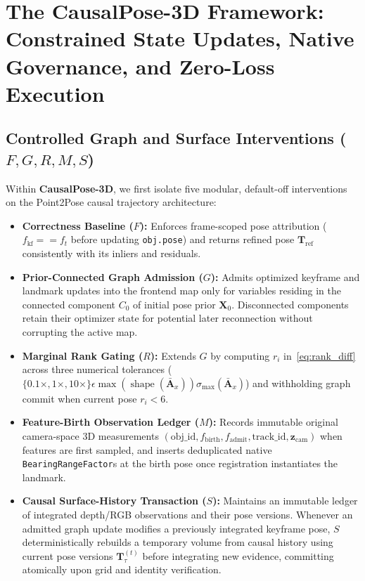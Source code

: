 \documentclass[10pt,journal]{IEEEtran}
\begin{document}
\section{The CausalPose-3D Framework: Constrained State Updates, Native Governance, and Zero-Loss Execution}
\label{sec:method}

\subsection{Controlled Graph and Surface Interventions ($F,G,R,M,S$)}
Within \textbf{CausalPose-3D}, we first isolate five modular, default-off interventions on the Point2Pose causal trajectory architecture:
\begin{itemize}
    \item \textbf{Correctness Baseline ($F$):} Enforces frame-scoped pose attribution ($f_{\mathrm{kf}}==f_t$ before updating \texttt{obj.pose}) and returns refined pose $\mathbf{T}_{\mathrm{ref}}$ consistently with its inliers and residuals.
    \item \textbf{Prior-Connected Graph Admission ($G$):} Admits optimized keyframe and landmark updates into the frontend map only for variables residing in the connected component $C_0$ of initial pose prior $\mathbf{X}_0$. Disconnected components retain their optimizer state for potential later reconnection without corrupting the active map.
    \item \textbf{Marginal Rank Gating ($R$):} Extends $G$ by computing $r_i$ in~\eqref{eq:rank_diff} across three numerical tolerances ($\{0.1\times,1\times,10\times\}\epsilon\max(\operatorname{shape}(\bar{\mathbf{A}}_x))\sigma_{\max}(\bar{\mathbf{A}}_x)$) and withholding graph commit when current pose $r_i<6$.
    \item \textbf{Feature-Birth Observation Ledger ($M$):} Records immutable original camera-space 3D measurements $(\text{obj\_id},f_{\mathrm{birth}},f_{\mathrm{admit}},\text{track\_id},\mathbf{z}_{\mathrm{cam}})$ when features are first sampled, and inserts deduplicated native \texttt{BearingRangeFactor}s at the birth pose once registration instantiates the landmark.
    \item \textbf{Causal Surface-History Transaction ($S$):} Maintains an immutable ledger of integrated depth/RGB observations and their pose versions. Whenever an admitted graph update modifies a previously integrated keyframe pose, $S$ deterministically rebuilds a temporary volume from causal history using current pose versions $\mathbf{T}_\tau^{(t)}$ before integrating new evidence, committing atomically upon grid and identity verification.
\end{itemize}
\end{document}
